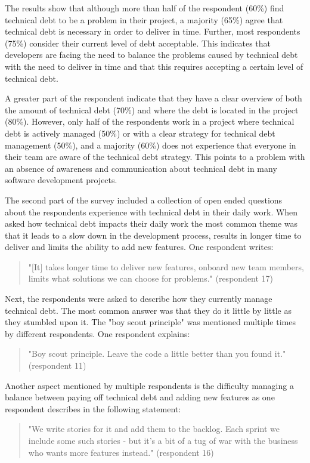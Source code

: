 

The results show that although more than half of the respondent (60\%) find technical debt to be a problem in their project, a majority (65\%) agree that technical debt is necessary in order to deliver in time.
Further, most respondents (75\%) consider their current level of debt acceptable.
This indicates that developers are facing the need to balance the problems caused by technical debt with the need to deliver in time and that this requires accepting a certain level of technical debt.

A greater part of the respondent indicate that they have a clear overview of both the amount of technical debt (70\%) and where the debt is located in the project (80\%).
However, only half of the respondents work in a project where technical debt is actively managed (50\%) or with a clear strategy for technical debt management (50\%), and a majority (60\%) does not experience that everyone in their team are aware of the technical debt strategy.
This points to a problem with an absence of awareness and communication about technical debt in many software development projects.

The second part of the survey included a collection of open ended questions about the respondents experience with technical debt in their daily work.
When asked how technical debt impacts their daily work the most common theme was that it leads to a slow down in the development process, results in longer time to deliver and limits the ability to add new features.
One respondent writes:
\begin{quote}
  "[It] takes longer time to deliver new features, onboard new team members, limits what solutions we can choose for problems." (respondent 17)
\end{quote}

Next, the respondents were asked to describe how they currently manage technical debt.
The most common answer was that they do it little by little as they stumbled upon it.
The "boy scout principle" was mentioned multiple times by different respondents.
One respondent explains:
\begin{quote}
  "Boy scout principle. Leave the code a little better than you found it." (respondent 11)
\end{quote}
Another aspect mentioned by multiple respondents is the difficulty managing a balance between paying off technical debt and adding new features as one respondent describes in the following statement: 
\begin{quote}
  "We write stories for it and add them to the backlog. Each sprint we include some such stories - but it's a bit of a tug of war with the business who wants more features instead." (respondent 16)
\end{quote}

